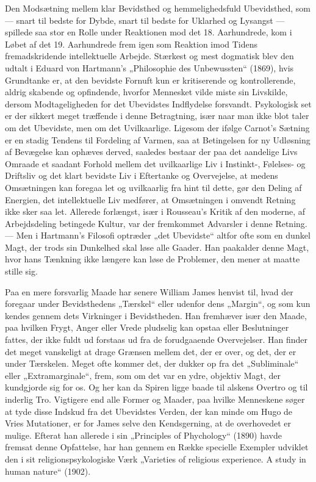 \documentclass[12pt,a4paper,openany]{book}
\newcommand{\opage}[1]{\marginnote{\footnotesize\textit{[#1]}}}
\begin{document}
Den Modsætning mellem klar Bevidsthed og hemmelighedsfuld
Ubevidsthed, som --- snart til bedste for Dybde, snart til bedste for
Uklarhed og Lysangst --- spillede saa stor en Rolle under Reaktionen
mod det 18. Aarhundrede, kom i Løbet af det 19. Aarhundrede
frem igen som Reaktion imod Tidens fremadskridende intellektuelle
Arbejde. Stærkest og mest dogmatisk blev den udtalt i Eduard von
Hartmann’s „Philosophie des Unbewussten“ (1869), hvis Grundtanke
er, at den bevidste Fornuft kun er kritiserende og kontrollerende,
aldrig skabende og opfindende, hvorfor Mennesket vilde miste sin
Livskilde, dersom Modtageligheden for det Ubevidstes Indflydelse
\opage{50}forsvandt. Psykologisk set er der sikkert meget træffende i denne
Betragtning, især naar man ikke blot taler om det Ubevidste, men
om det Uvilkaarlige. Ligesom der ifølge Carnot’s Sætning er en stadig
Tendens til Fordeling af Varmen, saa at Betingelsen for ny Udløsning
af Bevægelse kan ophæves derved, saaledes bestaar der paa
det aandelige Livs Omraade et saadant Forhold mellem det uvilkaarlige
Liv i Instinkt-, Følelses- og Driftsliv og det klart bevidste Liv
i Eftertanke og Overvejelse, at medens Omsætningen kan foregaa
let og uvilkaarlig fra hint til dette, gør den Deling af Energien, det
intellektuelle Liv medfører, at Omsætningen i omvendt Retning ikke
sker saa let. Allerede forlængst, især i Rousseau’s Kritik af den moderne,
af Arbejdsdeling betingede Kultur, var der fremkommet Advarsler
i denne Retning. --- Men i Hartmann’s Filosofi optræder „det
Ubevidste“ altfor ofte som en dunkel Magt, der trods sin Dunkelhed
skal løse alle Gaader. Han paakalder denne Magt, hvor hans Tænkning
ikke længere kan løse de Problemer, den mener at maatte
stille sig.

Paa en mere forsvarlig Maade har senere William James henvist
til, hvad der foregaar under Bevidsthedens „Tærskel“ eller udenfor
dens „Margin“, og som kun kendes gennem dets Virkninger i Bevidstheden.
Han fremhæver især den Maade, paa hvilken Frygt, Anger
eller Vrede pludselig kan opstaa eller Beslutninger fattes, der
ikke fuldt ud forstaas ud fra de forudgaaende Overvejelser. Han
finder det meget vanskeligt at drage Grænsen mellem det, der er
over, og det, der er under Tærskelen. Meget ofte kommer det, der
dukker op fra det „Subliminale“ eller „Extramarginale“, frem, som
om det var en ydre, objektiv Magt, der kundgjorde sig for os. Og
her kan da Spiren ligge baade til alskens Overtro og til inderlig Tro.
Vigtigere end alle Former og Maader, paa hvilke Menneskene søger
at tyde disse Indskud fra det Ubevidstes Verden, der kan minde
om Hugo de Vries Mutationer, er for James selve den Kendsgerning,
at de overhovedet er mulige. Efterat han allerede i sin „Principles
of Phychology“ (1890) havde fremsat denne Opfattelse, har han
gennem en Række specielle Exempler udviklet den i sit religionspsykologiske
Værk „Varieties of religious experience. A study in
human nature“ (1902).
\end{document}
